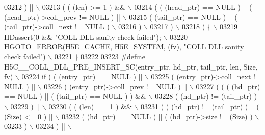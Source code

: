 \begin{DoxyCode}
03212 \textcolor{preprocessor}{     ) ||                                                                   \(\backslash\)}
03213 \textcolor{preprocessor}{     ( ( (len) >= 1 ) &&                                                    \(\backslash\)}
03214 \textcolor{preprocessor}{       ( ( (head\_ptr) == NULL ) || ( (head\_ptr)->coll\_prev != NULL ) ||     \(\backslash\)}
03215 \textcolor{preprocessor}{         ( (tail\_ptr) == NULL ) || ( (tail\_ptr)->coll\_next != NULL )        \(\backslash\)}
03216 \textcolor{preprocessor}{       )                                                                    \(\backslash\)}
03217 \textcolor{preprocessor}{     )                                                                      \(\backslash\)}
03218 \textcolor{preprocessor}{   ) \{                                                                      \(\backslash\)}
03219 \textcolor{preprocessor}{    HDassert(0 && "COLL DLL sanity check failed");                          \(\backslash\)}
03220 \textcolor{preprocessor}{    HGOTO\_ERROR(H5E\_CACHE, H5E\_SYSTEM, (fv), "COLL DLL sanity check failed") \(\backslash\)}
03221 \textcolor{preprocessor}{\}}
03222 
03223 \textcolor{preprocessor}{#define H5C\_\_COLL\_DLL\_PRE\_INSERT\_SC(entry\_ptr, hd\_ptr, tail\_ptr, len, Size, fv) \(\backslash\)}
03224 \textcolor{preprocessor}{if ( ( (entry\_ptr) == NULL ) ||                                                \(\backslash\)}
03225 \textcolor{preprocessor}{     ( (entry\_ptr)->coll\_next != NULL ) ||                                     \(\backslash\)}
03226 \textcolor{preprocessor}{     ( (entry\_ptr)->coll\_prev != NULL ) ||                                     \(\backslash\)}
03227 \textcolor{preprocessor}{     ( ( ( (hd\_ptr) == NULL ) || ( (tail\_ptr) == NULL ) ) &&                   \(\backslash\)}
03228 \textcolor{preprocessor}{       ( (hd\_ptr) != (tail\_ptr) )                                              \(\backslash\)}
03229 \textcolor{preprocessor}{     ) ||                                                                      \(\backslash\)}
03230 \textcolor{preprocessor}{     ( ( (len) == 1 ) &&                                                       \(\backslash\)}
03231 \textcolor{preprocessor}{       ( ( (hd\_ptr) != (tail\_ptr) ) || ( (Size) <= 0 ) ||                      \(\backslash\)}
03232 \textcolor{preprocessor}{         ( (hd\_ptr) == NULL ) || ( (hd\_ptr)->size != (Size) )                  \(\backslash\)}
03233 \textcolor{preprocessor}{       )                                                                       \(\backslash\)}
03234 \textcolor{preprocessor}{     ) ||                                                                      \(\backslash\)}

\end{DoxyCode}

